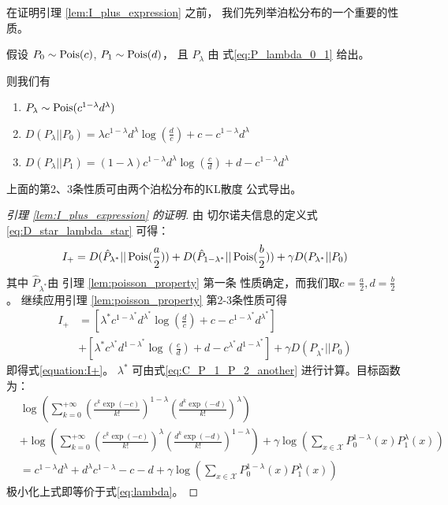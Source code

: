 在证明引理
 \ref{lem:I_plus_expression}   之前，
我们先列举泊松分布的一个重要的性质。
\begin{lemma}\label{lem:poisson_property}
假设 $P_0 \sim \operatorname{Pois}(c)$, $P_1 \sim \operatorname{Pois}(d)$，
且 $P_{\lambda}$ 由 式\eqref{eq:P_lambda_0_1}
给出。

则我们有
\begin{enumerate}
    \item $P_{\lambda} \sim \operatorname{Pois}(c^{1-\lambda} d^{\lambda})$
    \item $D(P_{\lambda}||P_0) = 
    \lambda c^{1-\lambda}d^{\lambda}\log(\frac{d}{c}) + c-c^{1-\lambda}d^{\lambda}$
    \item $D(P_{\lambda}||P_1) = (1-\lambda)
    c^{1-\lambda}d^{\lambda}\log(\frac{c}{d})
    + d-c^{1-\lambda}d^{\lambda}$
\end{enumerate}
\end{lemma}
上面的第2、3条性质可由两个泊松分布的KL散度
公式导出。
\begin{proof}[引理 \ref{lem:I_plus_expression} 的证明]
由 切尔诺夫信息的定义式 \eqref{eq:D_star_lambda_star} 
可得：
$$
I_+ = D(\hat{P}_{\lambda^*} || \operatorname{Pois}(\frac{a}{2}))
+ D(\hat{P}_{1-\lambda^*} || \operatorname{Pois}(\frac{b}{2}))
+ \gamma D(P_{\lambda^*} || P_0)
$$
其中 $\hat{P}_{\lambda^*}$由
引理 \ref{lem:poisson_property} 第一条
性质确定，而我们取$c=\frac{a}{2}, d=\frac{b}{2}$。
继续应用引理 \ref{lem:poisson_property} 第2-3条性质可得
\begin{align*}
    I_+ &= \left[\lambda^* c^{1-\lambda^*}d^{\lambda^*}
    \log(\frac{d}{c})+ c-c^{1-\lambda^*}d^{\lambda^*}
    \right] \\
&+ \left[\lambda^* c^{\lambda^*}d^{1-\lambda^*}\log(\frac{c}{d})
+ d - c^{\lambda^*}d^{1-\lambda^*}\right]
+ \gamma D(P_{\lambda^*} || P_0)
\end{align*}
即得式\eqref{equation:I+}。
$\lambda^*$ 可由式\eqref{eq:C_P_1_P_2_another} 
进行计算。目标函数为：
\begin{align*}
&\log\left(\sum_{k=0}^{+\infty} \left(\frac{c^k\exp(-c)}{k!}
\right)^{1-\lambda}
\left(\frac{d^k\exp(-d)}{k!} \right)^{\lambda}
\right) \\
& + \log\left(\sum_{k=0}^{+\infty} \left(\frac{c^k\exp(-c)}{k!}
\right)^{\lambda}
\left(\frac{d^k\exp(-d)}{k!} \right)^{1-\lambda}
\right)+
\gamma\log \left(\sum_{x\in \mathcal{X}}P^{1-\lambda}_0(x) P^{\lambda}_1(x)
\right)\\
& = c^{1-\lambda} d^{\lambda} 
+ d^{\lambda} c^{1-\lambda} -c -d +
\gamma\log \left(\sum_{x\in \mathcal{X}}P^{1-\lambda}_0(x) P^{\lambda}_1(x)
\right)
\end{align*}
极小化上式即等价于式\eqref{eq:lambda}。
\end{proof}

